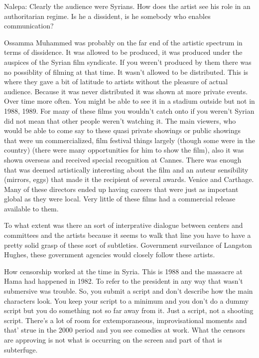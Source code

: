 \documentclass{article}
\begin{document}
\vspace{5mm}

Nalepa: Clearly the audience were Syrians.  How does the artist see his role in an authoritarian regime.  Is he a dissident, is he somebody who enables communication?  

\vspace{5mm}

Ossamma Muhammed was probably on the far end of the artistic spectrum in terms of dissidence.  It was allowed to be produced, it was produced under the auspices of the Syrian film syndicate.  If you weren't produced by them there was no possiblity of filming at that time.  It wasn't allowed to be distributed.  This is where they gave a bit of latitude to artists without the pleasure of actual audience.  Because it was never distributed it was shown at more private events.  Over time more often.  You might be able to see it in a stadium outside but not in 1988, 1989.  For many of these films you wouldn't catch onto if you weren't Syrian did not mean that other people weren't watching it.  The main viewers, who would be able to come say to these quasi private showings or public showings that were un commercialized, film festival things largely (though some were in the country) (there were many opportunities for him to show the film), also it was shown overseas and received special recognition at Cannes.  There was enough that was deemed artistically interesting about the film and an auteur sensibility (mirrors, eggs) that made it the recipient of several awards.  Venice and Carthage.  Many of these directors ended up having careers that were just as important global as they were local.  Very little of these films had a commercial release available to them.  

\vspace{5mm}

To what extent was there an sort of interprative dialogue between centers and committees and the artists because it seems to walk that line you have to have a pretty solid grasp of these sort of subtleties.  Government surveilance of Langston Hughes, these government agencies would closely follow these artists.  

\vspace{5mm}

How censorship worked at the time in Syria.  This is 1988 and the massacre at Hama had happened in 1982.  To refer to the president in any way that wasn't submersive was trouble.  So, you submit a script and don't describe how the main characters look.  You keep your script to a minimum and you don't do a dummy script but you do something not so far away from it.  Just a script, not a shooting script.  There's a lot of room for extemporaneous, improvisational moments and that' strue in the 2000 period and you see comedies at work.  What the censors are approving is not what is occurring on the screen and part of that is subterfuge.  
\end{document}
